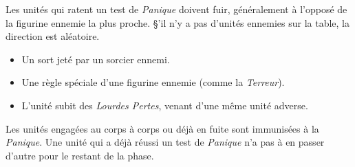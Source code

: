 Les unités qui ratent un test de \emph{Panique} doivent fuir, généralement à l'opposé de la figurine ennemie la plus proche. \S'il n'y a pas d'unités ennemies sur la table, la direction est aléatoire.

\begin{itemize}[label={-}]
\item Un sort jeté par un sorcier ennemi.
\item Une règle spéciale d'une figurine ennemie (comme la \emph{Terreur}).
\item L'unité subit des \emph{Lourdes Pertes}, venant d'une même unité adverse.
\end{itemize}
Les unités engagées au corps à corps ou déjà en fuite sont immunisées à la \emph{Panique}. Une unité qui a déjà réussi un test de \emph{Panique} n'a pas à en passer d'autre pour le restant de la phase.
